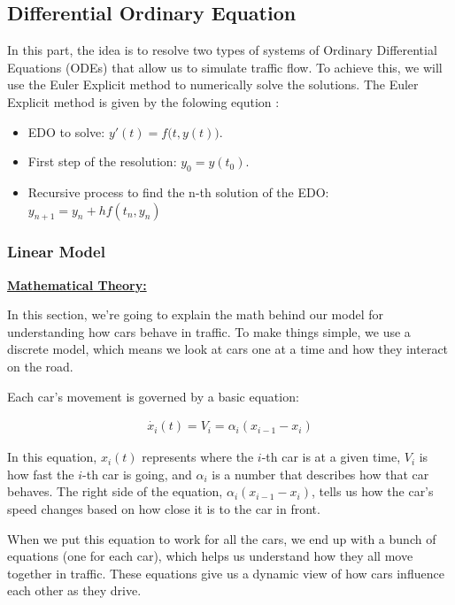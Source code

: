 \documentclass{article}
\begin{document}
		\subsection{Differential Ordinary Equation }
		In this part, the idea is to resolve two types of systems of Ordinary Differential Equations (ODEs) that allow us to simulate traffic flow. To achieve this, we will use the Euler Explicit method to numerically solve the solutions.
		The Euler Explicit method is given by the folowing eqution :
		\begin{itemize} 
			\item EDO to solve: $\boxed{y'(t) = f{\bigl (}t, y(t){\bigr )}}$.
			\item First step of the resolution: $\boxed{y_0 = y(t_0)}$.
			\item Recursive process to find the n-th solution of the EDO: $\boxed{y_{n+1} = y_{n} + hf(t_{n}, y_{n})}$
		\end{itemize}
		
		
		
		
		
		\subsubsection{Linear Model}
			\textbf{\underline{Mathematical Theory:}}
			\newline
			
			In this section, we're going to explain the math behind our model for understanding how cars behave in traffic. To make things simple, we use a discrete model, which means we look at cars one at a time and how they interact on the road.
			
			Each car's movement is governed by a basic equation:
			
			\begin{align*}
				\dot{x_i}(t) = V_i = \alpha_i(x_{i-1} - x_i)
			\end{align*}
			
			In this equation, \(x_i(t)\) represents where the \(i\)-th car is at a given time, \(V_i\) is how fast the \(i\)-th car is going, and \(\alpha_i\) is a number that describes how that car behaves. The right side of the equation, \(\alpha_i(x_{i-1} - x_i)\), tells us how the car's speed changes based on how close it is to the car in front.
			
			When we put this equation to work for all the cars, we end up with a bunch of equations (one for each car), which helps us understand how they all move together in traffic. These equations give us a dynamic view of how cars influence each other as they drive.
			
\end{document}
